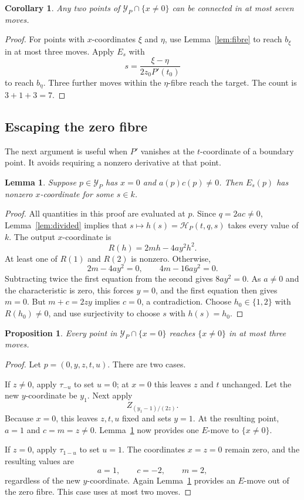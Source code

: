 \documentclass[11pt,letterpaper]{article}
\newcommand{\dd}{\mathcal H}
\newcommand{\Y}{\mathcal Y_P}
\newtheorem{proposition}[theorem]{Proposition}
\newtheorem{lemma}[theorem]{Lemma}
\newtheorem{corollary}[theorem]{Corollary}
\theoremstyle{remark}
\begin{document}
\begin{corollary}\label{cor:seven}
Any two points of $\Y\cap\{x\ne0\}$ can be connected in at most seven moves.
\end{corollary}

\begin{proof}
For points with $x$-coordinates $\xi$ and $\eta$, use Lemma~\ref{lem:fibre} to reach $b_\xi$ in at most three moves. Apply $E_s$ with
\[
s=\frac{\xi-\eta}{2z_0P'(t_0)}
\]
to reach $b_\eta$. Three further moves within the $\eta$-fibre reach the target. The count is $3+1+3=7$.
\end{proof}

\subsection{Escaping the zero fibre}

The next argument is useful when $P'$ vanishes at the $t$-coordinate of a boundary point. It avoids requiring a nonzero derivative at that point.

\begin{lemma}\label{lem:escape}
Suppose $p\in\Y$ has $x=0$ and $a(p)c(p)\ne0$. Then $E_s(p)$ has nonzero $x$-coordinate for some $s\in k$.
\end{lemma}

\begin{proof}
All quantities in this proof are evaluated at $p$. Since $q=2ac\ne0$, Lemma~\ref{lem:divided} implies that $s\mapsto h(s)=\dd_P(t,q,s)$ takes every value of $k$. The output $x$-coordinate is
\[
R(h)=2mh-4ay^2h^2.
\]
At least one of $R(1)$ and $R(2)$ is nonzero. Otherwise,
\[
2m-4ay^2=0,\qquad 4m-16ay^2=0.
\]
Subtracting twice the first equation from the second gives $8ay^2=0$. As $a\ne0$ and the characteristic is zero, this forces $y=0$, and the first equation then gives $m=0$. But $m+c=2zy$ implies $c=0$, a contradiction. Choose $h_0\in\{1,2\}$ with $R(h_0)\ne0$, and use surjectivity to choose $s$ with $h(s)=h_0$.
\end{proof}

\begin{proposition}\label{prop:boundary}
Every point in $\Y\cap\{x=0\}$ reaches $\{x\ne0\}$ in at most three moves.
\end{proposition}

\begin{proof}
Let $p=(0,y,z,t,u)$. There are two cases.

If $z\ne0$, apply $\tau_{-u}$ to set $u=0$; at $x=0$ this leaves $z$ and $t$ unchanged. Let the new $y$-coordinate be $y_1$. Next apply
\[
Z_{(y_1-1)/(2z)}.
\]
Because $x=0$, this leaves $z,t,u$ fixed and sets $y=1$. At the resulting point, $a=1$ and $c=m=z\ne0$. Lemma~\ref{lem:escape} now provides one $E$-move to $\{x\ne0\}$.

If $z=0$, apply $\tau_{1-u}$ to set $u=1$. The coordinates $x=z=0$ remain zero, and the resulting values are
\[
a=1,\qquad c=-2,\qquad m=2,
\]
regardless of the new $y$-coordinate. Again Lemma~\ref{lem:escape} provides an $E$-move out of the zero fibre. This case uses at most two moves.
\end{proof}
\end{document}
